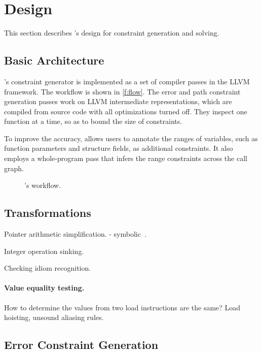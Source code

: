 \section{Design}
\label{s:gen}

This section describes \sys's design for constraint generation and
solving.

\subsection{Basic Architecture}

\sys's constraint generator is implemented as a set of compiler
passes in the LLVM~\cite{lattner:llvm} framework.  The workflow is
shown in \autoref{f:flow}.  The error and path constraint generation
passes work on LLVM intermediate representations, which are compiled
from source code with all optimizations turned off.  They inspect
one function at a time, so as to bound the size of constraints.

To improve the accuracy, \sys allows users to annotate the ranges
of variables, such as function parameters and structure fields, as
additional constraints. It also employs a whole-program pass that
infers the range constraints across the call graph.

\begin{figure}
\centering
\resizebox{0.9\linewidth}{!}{

}
\caption{\sys's workflow.}
\label{f:flow}
\end{figure}

\subsection{Transformations}

Pointer arithmetic simplification.
- symbolic~\cite{engelen:symbolic}.

Integer operation sinking.

Checking idiom recognition.

\paragraph{Value equality testing.}
How to determine the values from two load instructions
are the same? Load hoisting, unsound aliasing rules.

\subsection{Error Constraint Generation}

